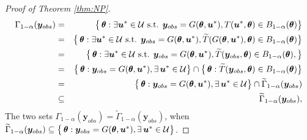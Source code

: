 \documentclass[12pt]{article}
\theoremstyle{shortspace}
\def\*#1{\bm{#1}}
\def\btheta{\mathop{\theta\kern-.45em\hbox{$\theta$}}\nolimits}
\begin{document}
\begin{proof}[Proof of Theorem \ref{thm:NP}]
\begin{eqnarray}
\Gamma_{1-\alpha}(\*y_{obs}) 
& = & \big\{\btheta: \exists \*u^* \in {\mathcal U} \mbox{ s.t. }  \*y_{obs} = G({\btheta}, \*u^*), T(\*u^*, \btheta)  \in B_{1 - \alpha}(\btheta) \big\}  \nonumber \\
& = &\big\{\btheta: \exists \*u^* \in {\mathcal U} \mbox{ s.t. }  \*y_{obs} = G({\btheta}, \*u^*), \widetilde T(G({\btheta}, \*u^*), \btheta)  \in B_{1 - \alpha}(\btheta) \big\} \nonumber
\\
& = &\big\{\btheta: \exists \*u^* \in {\mathcal U} \mbox{ s.t. }  \*y_{obs} = G({\btheta}, \*u^*), \widetilde T(\*y_{obs}, \btheta)  \in B_{1 - \alpha}(\btheta),  \big\} \nonumber 
\\
 & = &\big\{\btheta:  \*y_{obs} = G({\btheta}, \*u^*),  \exists \, \*u^* \in {\mathcal U} \big\} 
 \cap \big\{\btheta:  \widetilde T(\*y_{obs}, \btheta)  \in B_{1 - \alpha}(\btheta) \big\}
\nonumber \\
& = &\big\{\btheta:  \*y_{obs} = G({\btheta}, \*u^*),  \exists \, \*u^* \in {\mathcal U} \big\} 
 \cap \widetilde \Gamma_{1-\alpha}(\*y_{obs})
\nonumber
\\
& \subseteq & \widetilde \Gamma_{1-\alpha}(\*y_{obs}), \nonumber 
\end{eqnarray}
The two sets  
$\Gamma_{1-\alpha}(\*y_{obs}) = \widetilde \Gamma_{1-\alpha}(\*y_{obs})$, when $\widetilde \Gamma_{1-\alpha}(\*y_{obs}) \subseteq \big\{\btheta:  \*y_{obs} = G({\btheta}, \*u^*), 
\exists \, \*u^* \in {\mathcal U} \big\}$.
\end{proof}
\end{document}
